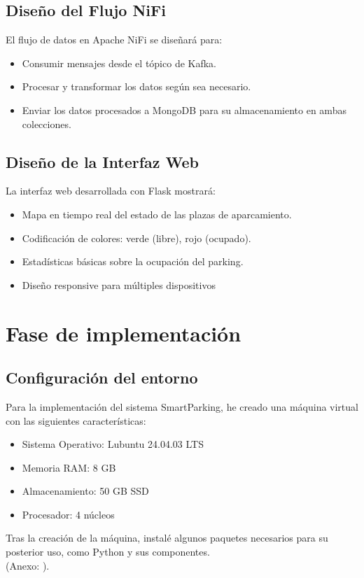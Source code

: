 \documentclass{../../../miPlantilla}
\begin{document}
\subsection{Diseño del Flujo NiFi}
El flujo de datos en Apache NiFi se diseñará para:
\begin{itemize}
  \item Consumir mensajes desde el tópico de Kafka.
  \item Procesar y transformar los datos según sea necesario.
  \item Enviar los datos procesados a MongoDB para su almacenamiento en ambas colecciones.
\end{itemize}

\subsection{Diseño de la Interfaz Web}
La interfaz web desarrollada con Flask mostrará:
\begin{itemize}
  \item Mapa en tiempo real del estado de las plazas de aparcamiento.
  \item Codificación de colores: verde (libre), rojo (ocupado).
  \item Estadísticas básicas sobre la ocupación del parking.
  \item Diseño responsive para múltiples dispositivos
\end{itemize}

\newpage

\section{Fase de implementación}

\subsection{Configuración del entorno}
Para la implementación del sistema SmartParking, he creado una máquina virtual con las siguientes características:
\begin{itemize}
  \item Sistema Operativo: Lubuntu 24.04.03 LTS
  \item Memoria RAM: 8 GB
  \item Almacenamiento: 50 GB SSD
  \item Procesador: 4 núcleos
\end{itemize}

Tras la creación de la máquina, instalé algunos paquetes necesarios para su posterior uso, como Python y sus componentes.\\
{\small(Anexo: )}.
\end{document}
